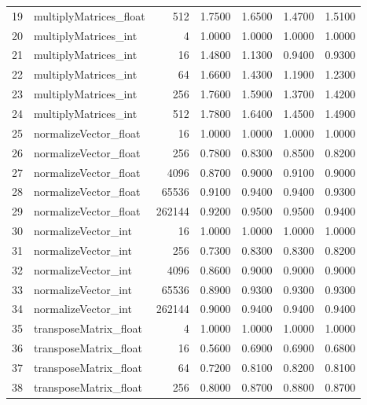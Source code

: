 \begin{tabular}{rlrrrrr}
 19 & multiplyMatrices\_float &    512 &   1.7500 &     1.6500 &   1.4700 &     1.5100 \\
 20 & multiplyMatrices\_int   &      4 &   1.0000 &     1.0000 &   1.0000 &     1.0000 \\
 21 & multiplyMatrices\_int   &     16 &   1.4800 &     1.1300 &   0.9400 &     0.9300 \\
 22 & multiplyMatrices\_int   &     64 &   1.6600 &     1.4300 &   1.1900 &     1.2300 \\
 23 & multiplyMatrices\_int   &    256 &   1.7600 &     1.5900 &   1.3700 &     1.4200 \\
 24 & multiplyMatrices\_int   &    512 &   1.7800 &     1.6400 &   1.4500 &     1.4900 \\
 25 & normalizeVector\_float  &     16 &   1.0000 &     1.0000 &   1.0000 &     1.0000 \\
 26 & normalizeVector\_float  &    256 &   0.7800 &     0.8300 &   0.8500 &     0.8200 \\
 27 & normalizeVector\_float  &   4096 &   0.8700 &     0.9000 &   0.9100 &     0.9000 \\
 28 & normalizeVector\_float  &  65536 &   0.9100 &     0.9400 &   0.9400 &     0.9300 \\
 29 & normalizeVector\_float  & 262144 &   0.9200 &     0.9500 &   0.9500 &     0.9400 \\
 30 & normalizeVector\_int    &     16 &   1.0000 &     1.0000 &   1.0000 &     1.0000 \\
 31 & normalizeVector\_int    &    256 &   0.7300 &     0.8300 &   0.8300 &     0.8200 \\
 32 & normalizeVector\_int    &   4096 &   0.8600 &     0.9000 &   0.9000 &     0.9000 \\
 33 & normalizeVector\_int    &  65536 &   0.8900 &     0.9300 &   0.9300 &     0.9300 \\
 34 & normalizeVector\_int    & 262144 &   0.9000 &     0.9400 &   0.9400 &     0.9400 \\
 35 & transposeMatrix\_float  &      4 &   1.0000 &     1.0000 &   1.0000 &     1.0000 \\
 36 & transposeMatrix\_float  &     16 &   0.5600 &     0.6900 &   0.6900 &     0.6800 \\
 37 & transposeMatrix\_float  &     64 &   0.7200 &     0.8100 &   0.8200 &     0.8100 \\
 38 & transposeMatrix\_float  &    256 &   0.8000 &     0.8700 &   0.8800 &     0.8700 \\

\end{tabular}
